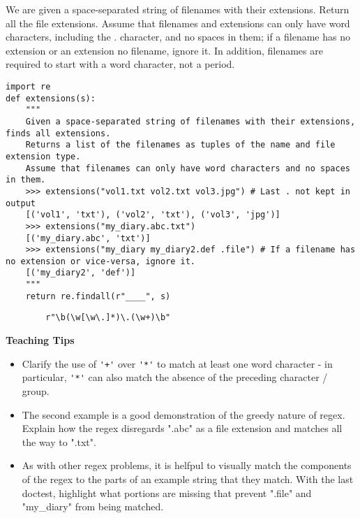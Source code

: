 \begin{blocksection}
\question We are given a space-separated string of filenames with their extensions. Return all the file extensions.
Assume that filenames and extensions can only have word characters, including the . character, and no spaces in them; if a filename has no extension or an extension no filename,
ignore it. In addition, filenames are required to start with a word character, not a period.

\begin{lstlisting}
import re
def extensions(s):
    """
    Given a space-separated string of filenames with their extensions, finds all extensions.
    Returns a list of the filenames as tuples of the name and file extension type.
    Assume that filenames can only have word characters and no spaces in them.
    >>> extensions("vol1.txt vol2.txt vol3.jpg") # Last . not kept in output
    [('vol1', 'txt'), ('vol2', 'txt'), ('vol3', 'jpg')]
    >>> extensions("my_diary.abc.txt")
    [('my_diary.abc', 'txt')]
    >>> extensions("my_diary my_diary2.def .file") # If a filename has no extension or vice-versa, ignore it.
    [('my_diary2', 'def')]
    """
    return re.findall(r"____", s)
\end{lstlisting}

\begin{solution}[2in]
    \begin{lstlisting}
        r"\b(\w[\w\.]*)\.(\w+)\b"
    \end{lstlisting}
\end{solution}
\end{blocksection}

\begin{guide}
\begin{blocksection}
\textbf{Teaching Tips}
    \begin{itemize}
        \item Clarify the use of \lstinline$'+'$ over \lstinline$'*'$ to match at least one word character - in particular, \lstinline$'*'$ can also match the absence of the preceding character / group.
        \item The second example is a good demonstration of the greedy nature of regex. Explain how the regex disregards ".abc" as a file extension and matches all the way to ".txt".
        \item As with other regex problems, it is helfpul to visually match the components of the regex to the parts of an example string that they match. With the last doctest, highlight what portions are missing that prevent ".file" and "my\_diary" from being matched.
    \end{itemize}
\end{blocksection}
\end{guide}
